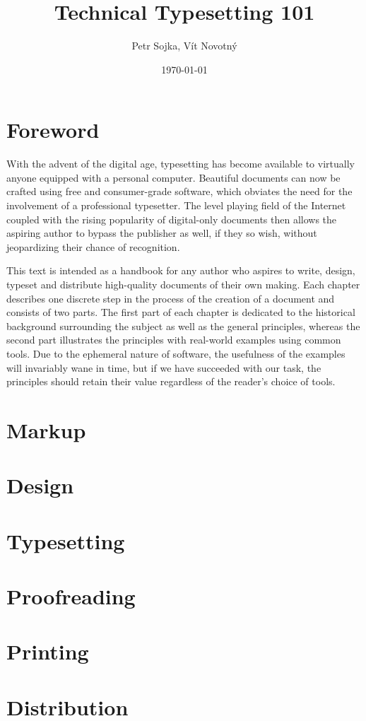 \documentclass{book}
\title{Technical Typesetting 101}
\author{Petr Sojka, Vít Novotný}
\date{\today}
\begin{document}
  \frontmatter
    \maketitle
    \tableofcontents
  \mainmatter
    \chapter{Foreword}
      With the advent of the digital age, typesetting has become available to
      virtually anyone equipped with a personal computer. Beautiful documents
      can now be crafted using free and consumer-grade software, which obviates
      the need for the involvement of a professional typesetter. The level
      playing field of the Internet coupled with the rising popularity of
      digital-only documents then allows the aspiring author to bypass the
      publisher as well, if they so wish, without jeopardizing their chance of
      recognition.
      
      This text is intended as a handbook for any author who aspires to write,
      design, typeset and distribute high-quality documents of their own making.
      Each chapter describes one discrete step in the process of the creation of
      a document and consists of two parts. The first part of each chapter is
      dedicated to the historical background surrounding the subject as well as
      the general principles, whereas the second part illustrates the principles
      with real-world examples using common tools. Due to the ephemeral nature
      of software, the usefulness of the examples will invariably wane in time,
      but if we have succeeded with our task, the principles should retain their
      value regardless of the reader's choice of tools.

    \chapter{Markup}
    \chapter{Design}
    \chapter{Typesetting}
    \chapter{Proofreading}
    \chapter{Printing}
    \chapter{Distribution}
\end{document}
